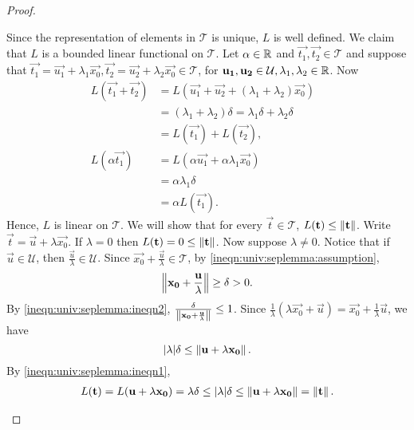\begin{proof}
\begin{step}
Since the representation of elements in $\mathcal{T}$ is unique, $L$ is well defined. We claim that $L$ is a bounded linear functional on $\mathcal{T}$. Let $\alpha \in {\mathbb R}$ and $\vec{t_1}, \vec{t_2} \in \mathcal{T}$ and suppose that $\vec{t_1} = \vec{u_1} + \lambda_1 \vec{x_0}, \vec{t_2} = \vec{u_2} + \lambda_2 \vec{x_0} \in \mathcal{T}$,
for $\mathbf{u_1}, \mathbf{u_2} \in \mathcal{U}, \lambda_1, \lambda_2 \in {\mathbb R}$. Now \begin{align*}
    L (\vec{t_1} + \vec{t_2}) &= L (\vec{u_1} + \vec{u_2} + (\lambda_1 + \lambda_2) \vec{x_0}) & \\
                              &=  (\lambda_1 + \lambda_2) \delta = \lambda_1 \delta + \lambda_2 \delta &\\
                              & = L(\vec{t_1}) + L(\vec{t_2}), & \\
    L( \alpha \vec{t_1}) &= L (\alpha \vec{u_1} + \alpha \lambda_1 \vec{x_0})  & \\
                         &= \alpha \lambda_1 \delta   & \\
                         &= \alpha L(\vec{t_1}).
\end{align*}
Hence, $L$ is linear on $\mathcal{T}$. We will show that for every $\vec{t} \in \mathcal{T}$, $L(\mathbf{t}) \leq \left\lVert\mathbf{t}\right\rVert$. Write $\vec{t} = \vec{u} + \lambda \vec{x_0}$. If $\lambda = 0$ then $L(\mathbf{t}) = 0 \leq \left\lVert\mathbf{t}\right\rVert$. Now suppose $\lambda \neq 0$. Notice that if $\vec{u} \in \mathcal{U}$, then $\frac{\vec{u}}{\lambda} 
\in \mathcal{U}$. Since $\vec{x_0} + \frac{\vec{u}}{\lambda} \in \mathcal{T}$, by \ref{ineqn:univ:seplemma:assumption},  \begin{align}
    \label{ineqn:univ:seplemma:ineqn2}
    \left\lVert\mathbf{x_0} + \frac{\mathbf{u}}{\lambda}\right\rVert \geq \delta > 0.
\end{align}
By \ref{ineqn:univ:seplemma:ineqn2}, $\frac{\delta}{\left\lVert\mathbf{x_0} + \frac{\mathbf{u}}{\lambda} \right\rVert} \leq 1$. Since $\frac{1}{\lambda} (\lambda \vec{x_0} + \vec{u}) = \vec{x_0} + \frac{1}{\lambda} \vec{u}$, we have \begin{equation}
    \label{ineqn:univ:seplemma:ineqn1}
    | \lambda | \delta \leq \left\lVert\mathbf{u} + \lambda \mathbf{x_0}\right\rVert.
\end{equation}
By \ref{ineqn:univ:seplemma:ineqn1}, \begin{align*}
    L(\mathbf{t}) = L (\mathbf{u} + \lambda \mathbf{x_0}) = \lambda \delta \leq |\lambda| \delta \leq \left\lVert\mathbf{u} + \lambda \mathbf{x_0}\right\rVert = \left\lVert\mathbf{t}\right\rVert.
\end{align*}
\end{step}

\end{proof}
